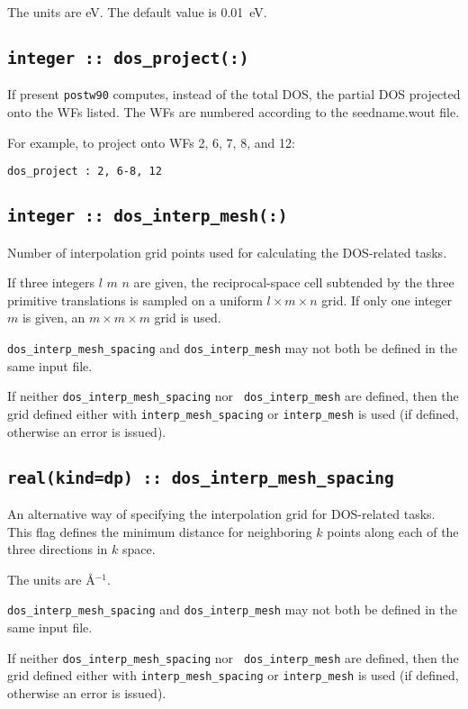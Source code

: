 The units are eV.
The default value is 0.01~eV.

\subsection[berry\_energy\_step]{\tt integer :: dos\_project(:)}

If present {\tt postw90} computes, instead of the total DOS, the
partial DOS projected onto the WFs listed. The WFs are numbered
according to the seedname.wout file.

For example, to project onto WFs 2, 6, 7, 8, and 12:

{\tt dos\_project : 2, 6-8, 12}


\subsection[boltz\_interp\_mesh]{\tt integer :: dos\_interp\_mesh(:)}
Number of interpolation grid points used for calculating the DOS-related tasks.

If three integers $l$ $m$ $n$ are given, the reciprocal-space cell
subtended by the three primitive translations is sampled on a uniform
$l\times m\times n$ grid.  If only one integer $m$ is given, an
$m\times m\times m$ grid is used.

{\tt dos\_interp\_mesh\_spacing} and {\tt dos\_interp\_mesh} may not
both be defined in the same input file.

If neither {\tt dos\_interp\_mesh\_spacing} nor {\tt
  dos\_interp\_mesh} are defined, then the grid defined either with
{\tt interp\_mesh\_spacing} or {\tt interp\_mesh} is used (if defined,
otherwise an error is issued).

\subsection[boltz\_interp\_mesh\_spacing]{\tt real(kind=dp) :: dos\_interp\_mesh\_spacing}

An alternative way of specifying the interpolation grid for
DOS-related tasks. This flag defines the minimum distance for
neighboring $k$ points along each of the three directions in $k$
space. 

The units are \AA$^{-1}$.

{\tt dos\_interp\_mesh\_spacing} and {\tt dos\_interp\_mesh} may
not both be defined in the same input file.

If neither {\tt dos\_interp\_mesh\_spacing} nor {\tt
  dos\_interp\_mesh} are defined, then the grid defined either with
{\tt interp\_mesh\_spacing} or {\tt interp\_mesh} is used (if defined,
otherwise an error is issued).


